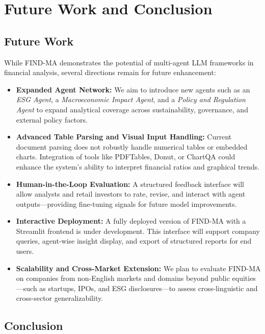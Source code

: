 \documentclass[11pt]{article}
\begin{document}
\section{Future Work and Conclusion}
\label{sec:conclusion}

\subsection*{Future Work}

While FIND-MA demonstrates the potential of multi-agent LLM frameworks in financial analysis, several directions remain for future enhancement:

\begin{itemize}
    \item \textbf{Expanded Agent Network:} We aim to introduce new agents such as an \textit{ESG Agent}, a \textit{Macroeconomic Impact Agent}, and a \textit{Policy and Regulation Agent} to expand analytical coverage across sustainability, governance, and external policy factors.
    
    \item \textbf{Advanced Table Parsing and Visual Input Handling:} Current document parsing does not robustly handle numerical tables or embedded charts. Integration of tools like PDFTables, Donut, or ChartQA could enhance the system’s ability to interpret financial ratios and graphical trends.

    \item \textbf{Human-in-the-Loop Evaluation:} A structured feedback interface will allow analysts and retail investors to rate, revise, and interact with agent outputs—providing fine-tuning signals for future model improvements.

    \item \textbf{Interactive Deployment:} A fully deployed version of FIND-MA with a Streamlit frontend is under development. This interface will support company queries, agent-wise insight display, and export of structured reports for end users.

    \item \textbf{Scalability and Cross-Market Extension:} We plan to evaluate FIND-MA on companies from non-English markets and domains beyond public equities—such as startups, IPOs, and ESG disclosures—to assess cross-linguistic and cross-sector generalizability.
\end{itemize}

\subsection*{Conclusion}
\end{document}
